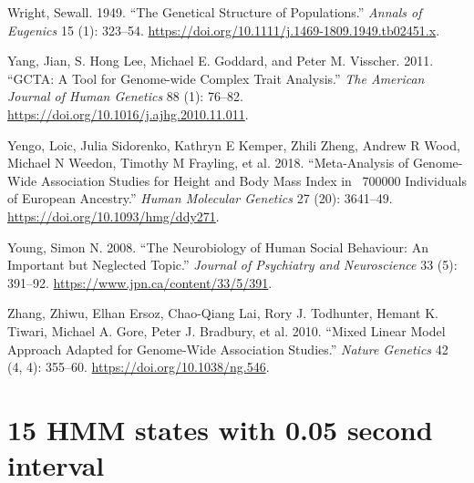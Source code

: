 \documentclass[
]{book}
\newlength{\cslhangindent}
\newlength{\cslentryspacingunit} %
\newenvironment{CSLReferences}[2] %
 {%
  \setlength{\parindent}{0pt}
  \ifodd #1
  \let\oldpar\par
  \def\par{\hangindent=\cslhangindent\oldpar}
  \fi
  \setlength{\parskip}{#2\cslentryspacingunit}
 }%
 {}
\begin{document}
\begin{CSLReferences}{1}{0}
\leavevmode{}%
Wright, Sewall. 1949. {``The {Genetical Structure} of {Populations}.''} \emph{Annals of Eugenics} 15 (1): 323--54. \url{https://doi.org/10.1111/j.1469-1809.1949.tb02451.x}.

\leavevmode{}%
Yang, Jian, S. Hong Lee, Michael E. Goddard, and Peter M. Visscher. 2011. {``{GCTA}: {A Tool} for {Genome-wide Complex Trait Analysis}.''} \emph{The American Journal of Human Genetics} 88 (1): 76--82. \url{https://doi.org/10.1016/j.ajhg.2010.11.011}.

\leavevmode{}%
Yengo, Loic, Julia Sidorenko, Kathryn E Kemper, Zhili Zheng, Andrew R Wood, Michael N Weedon, Timothy M Frayling, et al. 2018. {``Meta-Analysis of Genome-Wide Association Studies for Height and Body Mass Index in ~700000 Individuals of {European} Ancestry.''} \emph{Human Molecular Genetics} 27 (20): 3641--49. \url{https://doi.org/10.1093/hmg/ddy271}.

\leavevmode{}%
Young, Simon N. 2008. {``The Neurobiology of Human Social Behaviour: An Important but Neglected Topic.''} \emph{Journal of Psychiatry and Neuroscience} 33 (5): 391--92. \url{https://www.jpn.ca/content/33/5/391}.

\leavevmode{}%
Zhang, Zhiwu, Elhan Ersoz, Chao-Qiang Lai, Rory J. Todhunter, Hemant K. Tiwari, Michael A. Gore, Peter J. Bradbury, et al. 2010. {``Mixed Linear Model Approach Adapted for Genome-Wide Association Studies.''} \emph{Nature Genetics} 42 (4, 4): 355--60. \url{https://doi.org/10.1038/ng.546}.

\end{CSLReferences}

\hypertarget{appendix-appendix}{%
\appendix}


\hypertarget{hmm-states-with-0.05-second-interval}{%
\chapter{15 HMM states with 0.05 second interval}\label{hmm-states-with-0.05-second-interval}}
\end{document}
